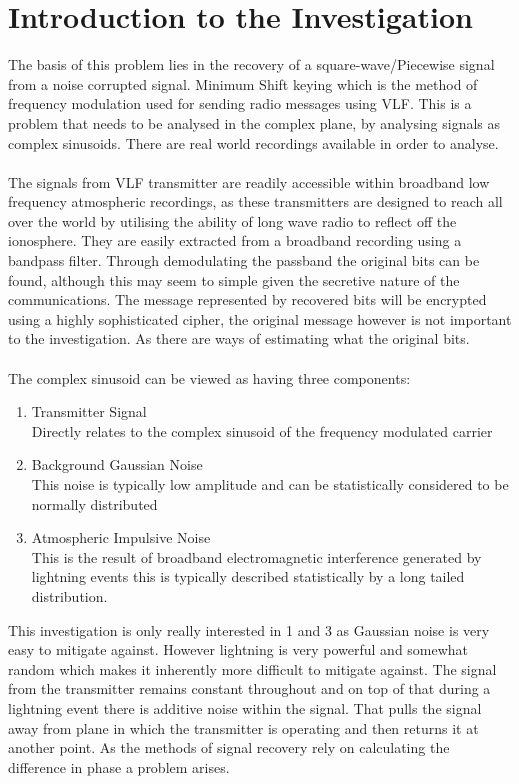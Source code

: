 \section{Introduction to the Investigation}
The basis of this problem lies in the recovery of a square-wave/Piecewise signal from a noise corrupted signal. Minimum Shift keying which is the method of frequency modulation used for sending radio messages using VLF. This is a problem that needs to be analysed in the complex plane, by analysing signals as complex sinusoids. There are real world recordings available in order to analyse. 
\\\\
The signals from VLF transmitter are readily accessible within broadband low frequency atmospheric recordings, as these transmitters are designed to reach all over the world by utilising the ability of long wave radio to reflect off the ionosphere. They are easily extracted from a broadband recording using a bandpass filter. Through demodulating the passband the original bits can be found, although this may seem to simple given the secretive nature of the communications. The message represented by recovered bits will be encrypted using a highly sophisticated cipher, the original message however is not important to the investigation. As there are ways of estimating what the original bits.
\\\\
The complex sinusoid can be viewed as having three components:
\begin{enumerate}
    \item Transmitter Signal 
    \\
    Directly relates to the complex sinusoid of the frequency modulated carrier
    \item Background Gaussian Noise
    \\
    This noise is typically low amplitude and can be statistically considered to be normally distributed
    \item Atmospheric Impulsive Noise
    \\
    This is the result of broadband electromagnetic interference generated by lightning events this is typically described statistically by a long tailed distribution.
\end{enumerate}
This investigation is only really interested in 1 and 3 as Gaussian noise is very easy to mitigate against. However lightning is very powerful and somewhat random which makes it inherently more difficult to mitigate against. The signal from the transmitter remains constant throughout and on top of that during a lightning event there is additive noise within the signal. That pulls the signal away from plane in which the transmitter is operating and then returns it at another point. As the methods of signal recovery rely on calculating the difference in phase a problem arises.
